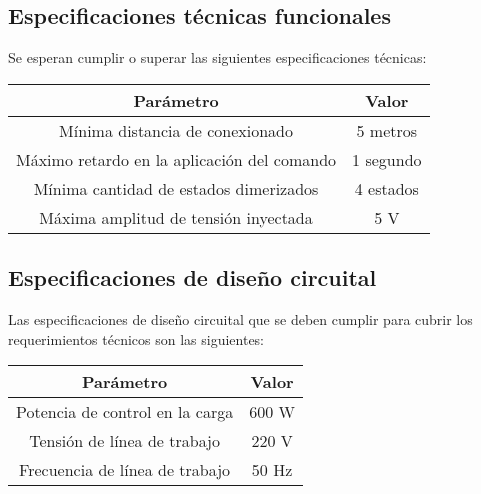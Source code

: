 


\subsection{Especificaciones técnicas funcionales} \label{ETF}
Se esperan cumplir o superar las siguientes especificaciones técnicas: 
\begin{center}
\begin{tabular}{| c | c |}
      	\hline
		Parámetro & Valor \\
        \hline
        \hline
        Mínima distancia de conexionado & 5 metros \\
        Máximo retardo en la aplicación del comando & 1 segundo \\
        Mínima cantidad de estados dimerizados & 4 estados \\
        Máxima amplitud de tensión inyectada & 5 V \\
        
        \hline
\end{tabular}
\end{center}

\subsection{Especificaciones de diseño circuital} 

Las especificaciones de diseño circuital que se deben cumplir para cubrir los requerimientos técnicos son las siguientes:

\begin{center}
\begin{tabular}{| c | c |}
      	\hline
		Parámetro & Valor \\
        \hline
        \hline        
        Potencia de control en la carga & 600 W \\
        Tensión de línea de trabajo & 220 V \\
        Frecuencia de línea de trabajo & 50 Hz \\
        
                
        \hline
\end{tabular}
\end{center}